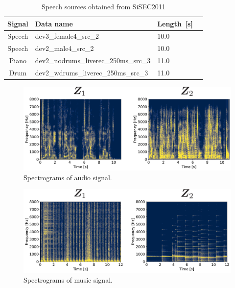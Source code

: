 \begin{table}[t]
  \begin{center}
   \caption{Speech sources obtained from SiSEC2011}
   \label{table:wav}
    \begin{tabular}{clll}\hline \hline
     Signal  & Data name &Length~[s]  \\ \hline
     Speech  & dev3\_female4\_src\_2 & 10.0  \\ \hline
     Speech  & dev2\_male4\_src\_2 &  10.0 \\ \hline
     Piano   & dev2\_nodrums\_liverec\_250ms\_src\_3 & 11.0\\ \hline
     Drum   & dev2\_wdrums\_liverec\_250ms\_src\_3 & 11.0 \\ \hline 
     \hline
    \end{tabular}
   \end{center}
\end{table}
\begin{figure}[t]
  \begin{center}
      \includegraphics[width=0.95\columnwidth]{figures/audio_init_spec.pdf}
  \end{center}
\caption{Spectrograms of audio signal.}
\label{fig:audio}
\end{figure}

\begin{figure}[t]
  \begin{center}
      \includegraphics[width=0.95\columnwidth]{figures/Drum_init_spec.pdf}
  \end{center}
\caption{Spectrograms of music signal.}
\label{fig:drum}
\end{figure}

